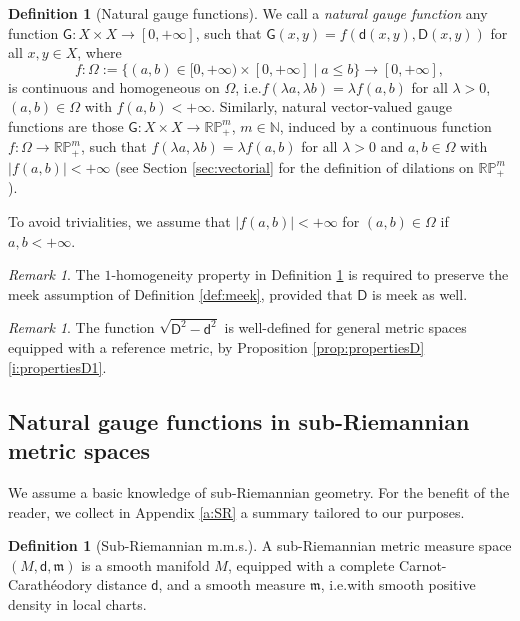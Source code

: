 \documentclass[11pt,a4paper]{article}
\theoremstyle{plain}
\theoremstyle{definition}
\newtheorem{definition}[theorem]{Definition}
\theoremstyle{remark}
\newtheorem{remark}[theorem]{Remark}
\numberwithin{equation}{section}
\newcommand{\RP}{\mathbb{RP}} %
\newcommand{\N}{\mathbb{N}} %
\newcommand{\mm}{\mathfrak m}
\newcommand{\sfd}{\mathsf d}
\newcommand{\sfD}{\mathsf D}
\newcommand{\sfG}{\mathsf G}
\begin{document}
\begin{definition}[Natural gauge functions]\label{def:naturalgauge} 
We call a \emph{natural gauge function} any function $\sfG : X\times X\to [0,+\infty]$, such that $\sfG(x,y) = f(\sfd(x,y),\sfD(x,y))$ for all $x,y\in X$, where 
\begin{equation}
f :  \Omega:=\{(a,b) \in [0,+\infty)\times [0,+\infty]\mid a \leq b\} \to [0,+\infty],
\end{equation}
is continuous and homogeneous on $\Omega$, i.e.\@ $f(\lambda a,\lambda b) = \lambda f(a,b)$ for all $\lambda >0$, $(a,b)\in\Omega$ with $f(a,b) < +\infty$. Similarly, natural vector-valued gauge functions are those $\sfG : X\times X \to \RP^m_+$, $m\in \N$, induced by a continuous function $f: \Omega\to\RP^m_+$, such that $f(\lambda a,\lambda b) = \lambda f(a,b)$ for all $\lambda>0$ and $a,b\in  \Omega$ with $|f(a,b)|<+\infty$ (see Section \ref{sec:vectorial} for the definition of dilations on $\RP^m_+$).

To avoid trivialities, we assume that $|f(a,b)|<+\infty$ for $(a,b)\in \Omega$ if $a,b<+\infty$.
\end{definition}
\begin{remark}
The $1$-homogeneity property in Definition \ref{def:naturalgauge} is required to preserve the meek assumption of Definition \ref{def:meek}, provided that $\sfD$  is meek as well.
\end{remark}
\begin{remark}
The function $\sqrt{\sfD^2-\sfd^2}$ is well-defined for general metric spaces equipped with a reference metric, by Proposition \ref{prop:propertiesD}\ref{i:propertiesD1}.
\end{remark}

\subsection{Natural gauge functions in sub-Riemannian metric spaces}\label{sec:naturalinSR}

We assume a basic knowledge of sub-Riemannian geometry. For the benefit of the reader, we collect in Appendix \ref{a:SR} a summary tailored to our purposes.

\begin{definition}[Sub-Riemannian m.m.s.]\label{def:srmms}
 A sub-Riemannian metric measure space $(M,\sfd,\mm)$ is a smooth manifold $M$, equipped with a complete Carnot-Carath\'eodory distance $\sfd$, and a smooth measure $\mm$, i.e.\@ with smooth positive density in local charts.
\end{definition}
\end{document}
